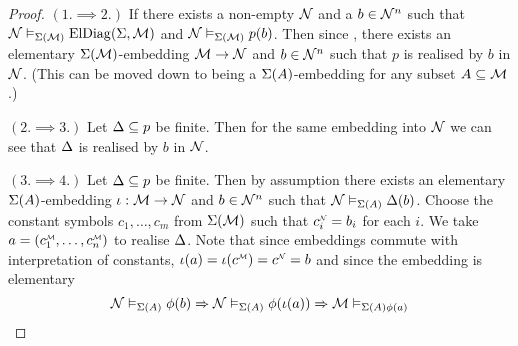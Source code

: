 \begin{proof}
    $(1. \implies 2.)$ If there exists a non-empty $\mathcal{N}$ and a
    $b \in {\mathcal{N}}^n$ such that 
    $\mathcal{N} \vDash_{\Sigma(\mathcal{M})} \mathrm{ElDiag}(\Sigma,\mathcal{M})$ and 
    $\mathcal{N} \vDash_{\Sigma(\mathcal{M})} p(b)$.
    Then since , 
    there exists an elementary $\Sigma(\mathcal{M})$-embedding $\mathcal{M} \to \mathcal{N}$ 
    and $b \in {\mathcal{N}}^n$ such that $p$ 
    is realised by $b$ in $\mathcal{N}$.
    (This can be moved down to being a $\Sigma(A)$-embedding for any 
    subset $A \subseteq \mathcal{M}$.)

    $(2. \implies 3.)$ Let $\Delta \subseteq p$ be finite.
    Then for the same embedding into $\mathcal{N}$ we can see that $\Delta$ 
    is realised by $b$ in $\mathcal{N}$.

    $(3. \implies 4.)$ Let $\Delta \subseteq p$ be finite.
    Then by assumption there exists an elementary $\Sigma(A)$-embedding 
    $\iota : \mathcal{M} \to \mathcal{N}$ and $b \in {\mathcal{N}}^n$ 
    such that  
    $\mathcal{N} \vDash_{\Sigma(A)} \Delta(b)$.
    Choose the constant symbols $c_1,\dots,c_m$ from $\Sigma(\mathcal{M})$ such that
    $\modintp{\NN}{c_i} = b_i$ for each $i$.
    We take $a = (\mmintp{c_1},\dots,\mmintp{c_n})$ to realise $\Delta$.
    Note that since embeddings commute with interpretation of constants,
    $\io(a) = \io(\mmintp{c}) = \nnintp{c} = b$ and since the 
    embedding is elementary 
    \[\mathcal{N} \vDash_{\Sigma(A)} \phi(b) 
    \Rightarrow \mathcal{N} \vDash_{\Sigma(A)} \phi(\iota(a)) 
    \Rightarrow \mathcal{M} \vDash_{\Sigma(A) \phi(a)}\]

%


\end{proof}
